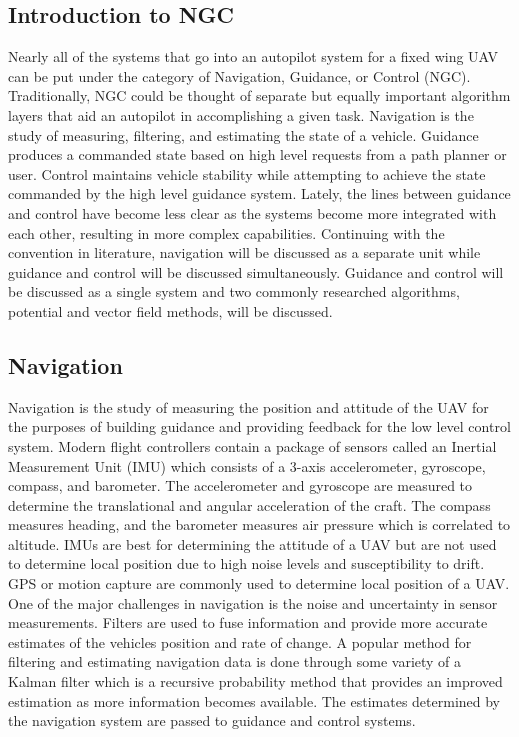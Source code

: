 \documentclass[numbered,pdftex]{ohio-etd}
\begin{document}
\subsection{Introduction to NGC}
Nearly all of the systems that go into an autopilot system for a fixed wing UAV can be put under the category of Navigation, Guidance, or Control (NGC). Traditionally, NGC could be thought of separate but equally important algorithm layers that aid an autopilot in accomplishing a given task. Navigation is the study of measuring, filtering, and estimating the state of a vehicle. Guidance produces a commanded state based on high level requests from a path planner or user. Control maintains vehicle stability while attempting to achieve the state commanded by the high level guidance system. Lately, the lines between guidance and control have become less clear as the systems become more integrated with each other, resulting in more complex capabilities. Continuing with the convention in literature, navigation will be discussed as a separate unit while guidance and control will be discussed simultaneously. Guidance and control will be discussed as a single system and two commonly researched algorithms, potential and vector field methods, will be discussed.

\subsection{Navigation}

Navigation is the study of measuring the position and attitude of the UAV for the purposes of building guidance and providing feedback for the low level control system. Modern flight controllers contain a package of sensors called an Inertial Measurement Unit (IMU) which consists of a 3-axis accelerometer, gyroscope, compass, and barometer. The accelerometer and gyroscope are measured to determine the translational and angular acceleration of the craft. The compass measures heading, and the barometer measures air pressure which is correlated to altitude. IMUs are best for determining the attitude of a UAV but are not used to determine local position due to high noise levels and susceptibility to drift. GPS or motion capture are commonly used to determine local position of a UAV. One of the major challenges in navigation is the noise and uncertainty in sensor measurements. Filters are used to fuse information and provide more accurate estimates of the vehicles position and rate of change. A popular method for filtering and estimating navigation data is done through some variety of a Kalman filter which is a recursive probability method that provides an improved estimation as more information becomes available. The estimates determined by the navigation system are passed to guidance and control systems.
\end{document}
